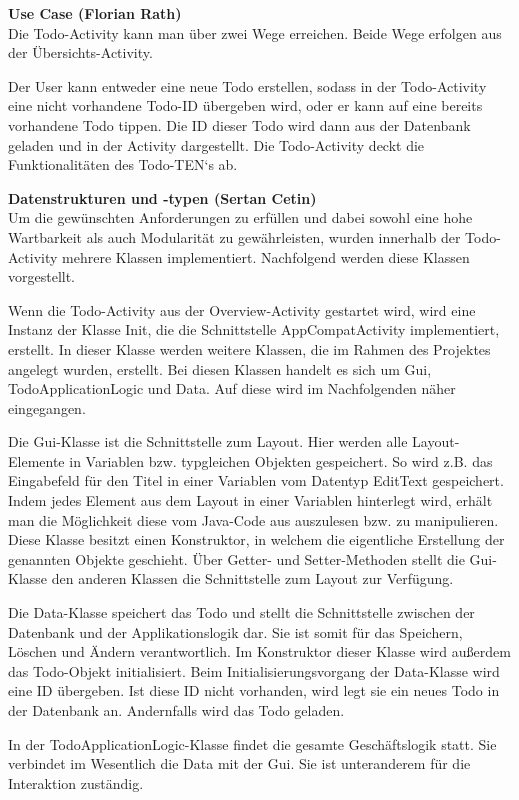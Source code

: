 \textbf{Use Case (Florian Rath)}\\
Die Todo-Activity kann man über zwei Wege erreichen. Beide Wege erfolgen aus der Übersichts-Activity.

Der User kann entweder eine neue Todo erstellen, sodass in der Todo-Activity eine nicht vorhandene Todo-ID übergeben wird, oder er kann auf eine bereits vorhandene Todo tippen. Die ID dieser Todo wird dann aus der Datenbank geladen und in der Activity dargestellt. Die Todo-Activity deckt die Funktionalitäten des Todo-TEN‘s ab.

\textbf{Datenstrukturen und -typen (Sertan Cetin)}\\
Um die gewünschten Anforderungen zu erfüllen und dabei sowohl eine hohe Wartbarkeit als auch Modularität zu gewährleisten, wurden innerhalb der Todo-Activity mehrere Klassen implementiert. Nachfolgend werden diese Klassen vorgestellt.

Wenn die Todo-Activity aus der Overview-Activity gestartet wird, wird eine Instanz der Klasse Init, die die Schnittstelle AppCompatActivity implementiert, erstellt. In dieser Klasse werden weitere Klassen, die im Rahmen des Projektes angelegt wurden, erstellt. Bei diesen Klassen handelt es sich um Gui, TodoApplicationLogic und Data. Auf diese wird im Nachfolgenden näher eingegangen.

Die Gui-Klasse ist die Schnittstelle zum Layout. Hier werden alle Layout-Elemente in Variablen bzw. typgleichen Objekten gespeichert. So wird z.B. das Eingabefeld für den Titel in einer Variablen vom Datentyp EditText gespeichert. Indem jedes Element aus dem Layout in einer Variablen hinterlegt wird, erhält man die Möglichkeit diese vom Java-Code aus auszulesen bzw. zu manipulieren. Diese Klasse besitzt einen Konstruktor, in welchem die eigentliche Erstellung der genannten Objekte geschieht. Über Getter- und Setter-Methoden stellt die Gui-Klasse den anderen Klassen die Schnittstelle zum Layout zur Verfügung.

Die Data-Klasse speichert das Todo und stellt die Schnittstelle zwischen der Datenbank und der Applikationslogik dar. Sie ist somit für das Speichern, Löschen und Ändern verantwortlich. Im Konstruktor dieser Klasse wird außerdem das Todo-Objekt initialisiert. Beim Initialisierungsvorgang der Data-Klasse wird eine ID übergeben. Ist diese ID nicht vorhanden, wird legt sie ein neues Todo in der Datenbank an. Andernfalls wird das Todo geladen.

In der TodoApplicationLogic-Klasse findet die gesamte Geschäftslogik statt. Sie verbindet im Wesentlich die Data mit der Gui. Sie ist unteranderem für die Interaktion zuständig.

